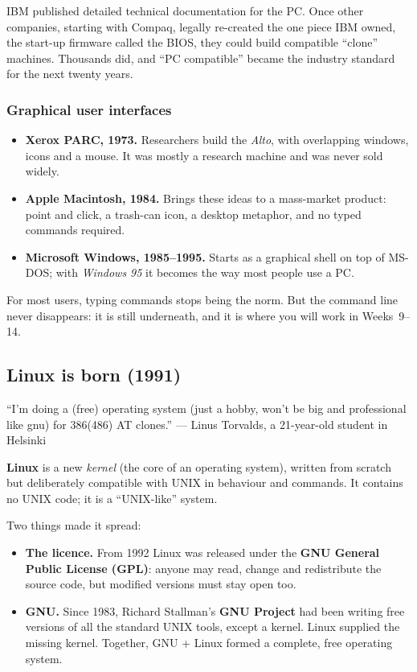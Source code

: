 \documentclass[11pt,a4paper]{article}
\newcommand{\term}[1]{\textbf{\color{mintdeep}#1}}
\begin{document}
IBM published detailed technical documentation for the PC. Once other companies, starting with Compaq, legally re-created the one piece IBM owned, the start-up firmware called the BIOS, they could build compatible ``clone'' machines. Thousands did, and ``PC compatible'' became the industry standard for the next twenty years.

\subsubsection{Graphical user interfaces}
\begin{itemize}
  \item \textbf{Xerox PARC, 1973.} Researchers build the \emph{Alto}, with overlapping windows, icons and a mouse. It was mostly a research machine and was never sold widely.
  \item \textbf{Apple Macintosh, 1984.} Brings these ideas to a mass-market product: point and click, a trash-can icon, a desktop metaphor, and no typed commands required.
  \item \textbf{Microsoft Windows, 1985--1995.} Starts as a graphical shell on top of MS-DOS; with \emph{Windows 95} it becomes the way most people use a PC.
\end{itemize}

For most users, typing commands stops being the norm. But the command line never disappears: it is still underneath, and it is where you will work in Weeks~9--14.

\subsection{Linux is born (1991)}

\begin{histnote}
``I'm doing a (free) operating system (just a hobby, won't be big and professional like gnu) for 386(486) AT clones.'' \hfill --- Linus Torvalds, a 21-year-old student in Helsinki
\end{histnote}

\term{Linux} is a new \emph{kernel} (the core of an operating system), written from scratch but deliberately compatible with UNIX in behaviour and commands. It contains no UNIX code; it is a ``UNIX-like'' system.

Two things made it spread:
\begin{itemize}
  \item \textbf{The licence.} From 1992 Linux was released under the \textbf{GNU General Public License (GPL)}: anyone may read, change and redistribute the source code, but modified versions must stay open too.
  \item \textbf{GNU.} Since 1983, Richard Stallman's \textbf{GNU Project} had been writing free versions of all the standard UNIX tools, except a kernel. Linux supplied the missing kernel. Together, GNU + Linux formed a complete, free operating system.
\end{itemize}
\end{document}
